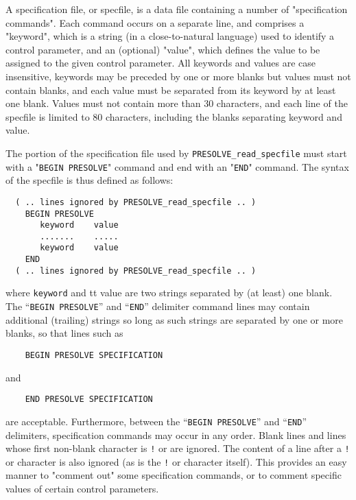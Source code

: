 \documentclass{galahad}
\newcommand{\packagename}{PRESOLVE}
\begin{document}
A specification file, or specfile, is a data file containing a number of
"specification commands". Each command occurs on a separate line,
and comprises a "keyword",
which is a string (in a close-to-natural language) used to identify a
control parameter, and
an (optional) "value", which defines the value to be assigned to the given
control parameter. All keywords and values are case insensitive,
keywords may be preceded by one or more blanks but
values must not contain blanks, and
each value must be separated from its keyword by at least one blank.
Values must not contain more than 30 characters, and
each line of the specfile is limited to 80 characters,
including the blanks separating keyword and value.

The portion of the specification file used by {\tt \packagename\_read\_specfile}
must start with a "{\tt BEGIN \packagename}" command and end with an
"{\tt END}" command.  The syntax of the specfile is thus defined as follows:
\begin{verbatim}
  ( .. lines ignored by PRESOLVE_read_specfile .. )
    BEGIN PRESOLVE
       keyword    value
       .......    .....
       keyword    value
    END
  ( .. lines ignored by PRESOLVE_read_specfile .. )
\end{verbatim}
where {\tt keyword} and {tt value} are two strings separated by (at least) one
blank. The ``{\tt BEGIN \packagename}'' and ``{\tt END}'' delimiter command
lines  may contain additional (trailing) strings so long as such strings are
separated by one or more blanks, so that lines such as
\begin{verbatim}
    BEGIN PRESOLVE SPECIFICATION
\end{verbatim}
and
\begin{verbatim}
    END PRESOLVE SPECIFICATION
\end{verbatim}
are acceptable. Furthermore, between the
``{\tt BEGIN \packagename}'' and ``{\tt END}'' delimiters,
specification commands may occur in any order.  Blank lines and
lines whose first non-blank character is {\tt !} or {\tt *} are ignored.
The content of a line after a {\tt !} or {\tt *} character is also
ignored (as is the {\tt !} or {\tt *}
character itself). This provides an easy manner to "comment out" some
specification commands, or to comment specific values
of certain control parameters.
\end{document}
